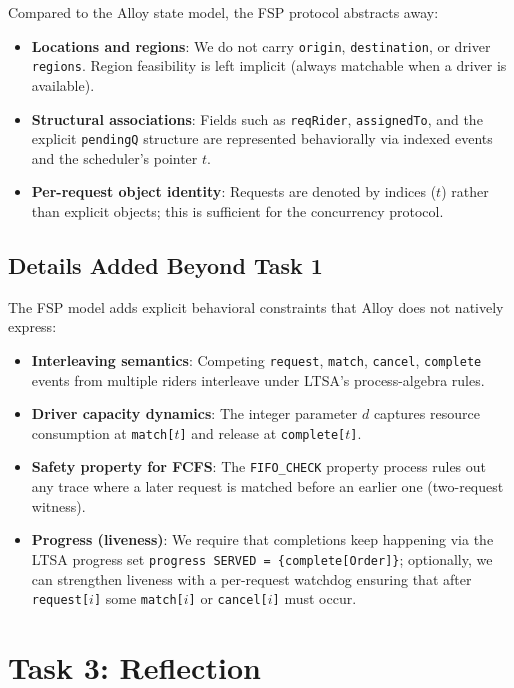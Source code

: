 \documentclass[11pt]{article}
\begin{document}
Compared to the Alloy state model, the FSP protocol abstracts away:
\begin{itemize}[leftmargin=1.5em]
  \item \textbf{Locations and regions}: We do not carry \texttt{origin}, \texttt{destination}, or driver \texttt{regions}. Region feasibility is left implicit (always matchable when a driver is available).
  \item \textbf{Structural associations}: Fields such as \texttt{reqRider}, \texttt{assignedTo}, and the explicit \texttt{pendingQ} structure are represented behaviorally via indexed events and the scheduler’s pointer $t$.
  \item \textbf{Per-request object identity}: Requests are denoted by indices ($t$) rather than explicit objects; this is sufficient for the concurrency protocol.
\end{itemize}

\subsection{Details Added Beyond Task 1}

The FSP model adds explicit behavioral constraints that Alloy does not natively express:
\begin{itemize}[leftmargin=1.5em]
  \item \textbf{Interleaving semantics}: Competing \texttt{request}, \texttt{match}, \texttt{cancel}, \texttt{complete} events from multiple riders interleave under LTSA’s process-algebra rules.
  \item \textbf{Driver capacity dynamics}: The integer parameter $d$ captures resource consumption at \texttt{match[$t$]} and release at \texttt{complete[$t$]}.
  \item \textbf{Safety property for FCFS}: The \texttt{FIFO\_CHECK} property process rules out any trace where a later request is matched before an earlier one (two-request witness).
  \item \textbf{Progress (liveness)}: We require that completions keep happening via the LTSA progress set \texttt{progress SERVED = \{complete[Order]\}}; optionally, we can strengthen liveness with a per-request watchdog ensuring that after \texttt{request[$i$]} some \texttt{match[$i$]} or \texttt{cancel[$i$]} must occur.
\end{itemize}

\section{Task 3: Reflection}
\label{sec:task3}
\end{document}
